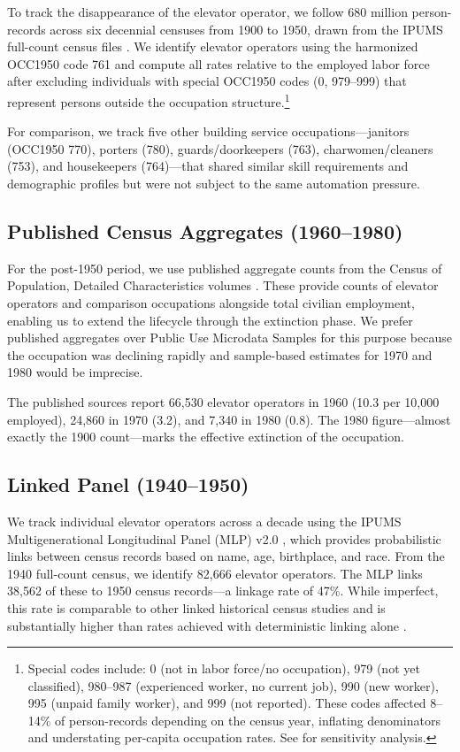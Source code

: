 \documentclass[12pt]{article}
\begin{document}
To track the disappearance of the elevator operator, we follow 680 million person-records across six decennial censuses from 1900 to 1950, drawn from the IPUMS full-count census files \citep{ruggles2024}. We identify elevator operators using the harmonized OCC1950 code 761 and compute all rates relative to the employed labor force after excluding individuals with special OCC1950 codes (0, 979--999) that represent persons outside the occupation structure.\footnote{Special codes include: 0 (not in labor force/no occupation), 979 (not yet classified), 980--987 (experienced worker, no current job), 990 (new worker), 995 (unpaid family worker), and 999 (not reported). These codes affected 8--14\% of person-records depending on the census year, inflating denominators and understating per-capita occupation rates. See  for sensitivity analysis.}

For comparison, we track five other building service occupations---janitors (OCC1950 770), porters (780), guards/doorkeepers (763), charwomen/cleaners (753), and housekeepers (764)---that shared similar skill requirements and demographic profiles but were not subject to the same automation pressure.

\subsection{Published Census Aggregates (1960--1980)}

For the post-1950 period, we use published aggregate counts from the Census of Population, Detailed Characteristics volumes \citep{census1960}. These provide counts of elevator operators and comparison occupations alongside total civilian employment, enabling us to extend the lifecycle through the extinction phase. We prefer published aggregates over Public Use Microdata Samples for this purpose because the occupation was declining rapidly and sample-based estimates for 1970 and 1980 would be imprecise.

The published sources report 66,530 elevator operators in 1960 (10.3 per 10,000 employed), 24,860 in 1970 (3.2), and 7,340 in 1980 (0.8). The 1980 figure---almost exactly the 1900 count---marks the effective extinction of the occupation.

\subsection{Linked Panel (1940--1950)}

We track individual elevator operators across a decade using the IPUMS Multigenerational Longitudinal Panel (MLP) v2.0 \citep{ruggles2021}, which provides probabilistic links between census records based on name, age, birthplace, and race. From the 1940 full-count census, we identify 82,666 elevator operators. The MLP links 38,562 of these to 1950 census records---a linkage rate of 47\%. While imperfect, this rate is comparable to other linked historical census studies and is substantially higher than rates achieved with deterministic linking alone \citep{abramitzky2021, bailey2020}.
\end{document}
